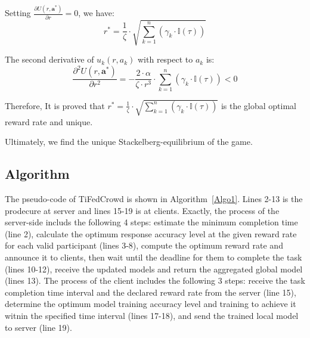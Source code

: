\documentclass[final,1p,times]{elsarticle}
\begin{document}
Setting $\frac{\partial U(r,\bm{a}^\ast)}{\partial r} = 0$, we have:
\begin{equation}
	r^\ast =\frac{1}{\zeta}\cdot\sqrt{\sum_{k=1}^n(\gamma_k\cdot\mathbb{I}(\tau))}
\end{equation}	

The second derivative of $u_k(r,a_k)$ with respect to $a_k$ is:
\begin{equation}
	\frac{\partial^2 U(r,\bm{a}^\ast)}{\partial r^2} = - \frac{2\cdot\alpha}{\zeta\cdot r^3}\cdot\sum_{k=1}^n(\gamma_k\cdot\mathbb{I}(\tau)) < 0
\end{equation}	

Therefore, It is proved that $r^\ast = \frac{1}{\zeta}\cdot\sqrt{\sum_{k=1}^n(\gamma_k\cdot\mathbb{I}(\tau))}$ is the global optimal reward rate and unique. 

Ultimately, we find the unique Stackelberg-equilibrium of the game.
\subsection{Algorithm}
The pseudo-code of TiFedCrowd is shown in Algorithm~\ref{Algo1}. Lines 2-13 is the prodecure at server and lines 15-19 is at clients. Exactly, the process of the server-side includs the following 4 steps: estimate the minimum completion time (line 2), calculate the optimum response accuracy level at the given reward rate for each valid participant (lines 3-8), compute the optimum reward rate and announce it to clients, then wait until the deadline for them to complete the task (lines 10-12), receive the updated models and return the aggregated global model (lines 13).
The process of the client includes the following 3 steps: receive
the task completion time interval and the declared reward rate from the server (line 15), determine the optimum model training accuracy level and training to achieve it witnin the specified time interval (lines 17-18), and send the trained local model to server (line 19). 
\end{document}
